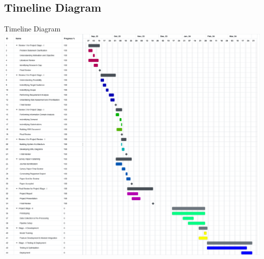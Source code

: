\subsection{Timeline Diagram}
\begin{frame}{Timeline Diagram}
	\centering
	\includegraphics[height=0.8\textheight]{components/images/timeline.png}
\end{frame}

